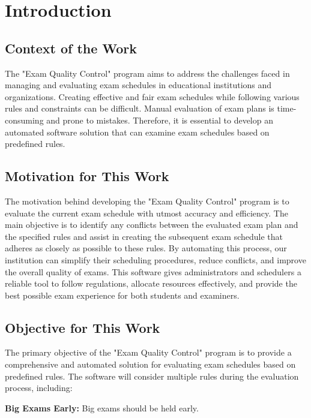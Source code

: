\newpage
\tableofcontents


\newpage
{} 

\section{Introduction}
\subsection{Context of the Work}
The "Exam Quality Control" program aims to address the challenges faced in managing and evaluating exam schedules in educational institutions and organizations. Creating effective and fair exam schedules while following various rules and constraints can be difficult. Manual evaluation of exam plans is time-consuming and prone to mistakes. Therefore, it is essential to develop an automated software solution that can examine exam schedules based on predefined rules.
\subsection{Motivation for This Work}
The motivation behind developing the "Exam Quality Control" program is to evaluate the current exam schedule with utmost accuracy and efficiency. The main objective is to identify any conflicts between the evaluated exam plan and the specified rules and assist in creating the subsequent exam schedule that adheres as closely as possible to these rules. By automating this process, our institution can simplify their scheduling procedures, reduce conflicts, and improve the overall quality of exams. This software gives administrators and schedulers a reliable tool to follow regulations, allocate resources effectively, and provide the best possible exam experience for both students and examiners.
\subsection{Objective for This Work}
The primary objective of the "Exam Quality Control" program is to provide a comprehensive and automated solution for evaluating exam schedules based on predefined rules. The software will consider multiple rules during the evaluation process, including:\vspace{\baselineskip}

    \textbf{Big Exams Early:} \vspace{\baselineskip}
    Big exams should be held early.
    

